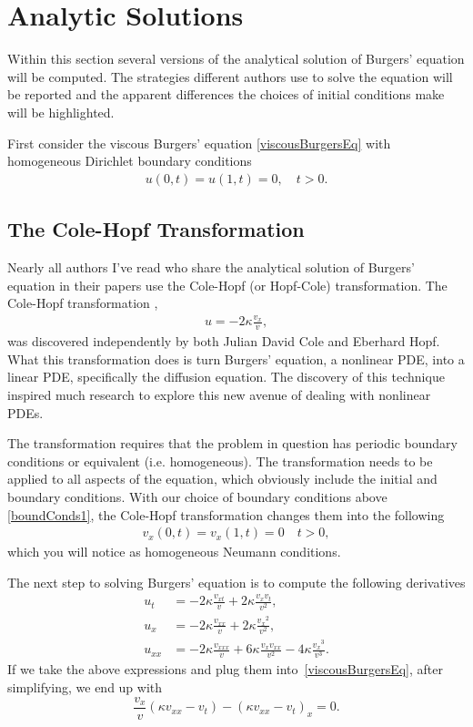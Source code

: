 \documentclass[undefended]{sfuthesis}
\begin{document}
\chapter{Analytic Solutions}
\label{sec:analyticalSolution}

Within this section several versions of the analytical solution of Burgers' equation will be computed. The strategies different authors use to solve the equation will be reported and the apparent differences the choices of initial conditions make will be highlighted. 

First consider the viscous Burgers' equation \eqref{viscousBurgersEq} with homogeneous Dirichlet boundary conditions
\begin{align}
u(0, t) = u(1, t) = 0, \quad t > 0. \label{boundConds1}
\end{align}

\section{The Cole-Hopf Transformation}
\label{sec:coleHopf}

Nearly all authors I've read who share the analytical solution of Burgers' equation in their papers use the Cole-Hopf (or Hopf-Cole) transformation. The Cole-Hopf transformation \cite{hopf, cole},
\begin{align}
u = -2 \kappa \frac{v_x}{v}, \label{coleHopf}
\end{align}
was discovered independently by both Julian David Cole and Eberhard Hopf. What this transformation does is turn Burgers' equation, a nonlinear PDE, into a linear PDE, specifically the diffusion equation. The discovery of this technique inspired much research to explore this new avenue of dealing with nonlinear PDEs. 

The transformation requires that the problem in question has periodic boundary conditions or equivalent (i.e. homogeneous). The transformation needs to be applied to all aspects of the equation, which obviously include the initial and boundary conditions. With our choice of boundary conditions above \eqref{boundConds1}, the Cole-Hopf transformation changes them into the following
\begin{align}
v_x(0, t) = v_x(1, t) = 0 \quad t > 0, \label{boundConds1ColeHopf}
\end{align}
which you will notice as homogeneous Neumann conditions. 

The next step to solving Burgers' equation is to compute the following derivatives
\begin{align*}
u_t    &= -2 \kappa \frac{v_{xt }}{v} + 2 \kappa \frac{v_x v_t}{v^2}, \\
u_x    &= -2 \kappa \frac{v_{xx }}{v} + 2 \kappa \frac{{v_x}^2}{v^2}, \\
u_{xx} &= -2 \kappa \frac{v_{xxx}}{v} + 6 \kappa \frac{v_x v_{xx}}{v^2} - 4 \kappa \frac{{v_x}^3}{v^3}.
\end{align*}
If we take the above expressions and plug them into~\eqref{viscousBurgersEq}, after simplifying, we end up with \[\frac{v_x}{v}(\kappa v_{xx} - v_t) - (\kappa v_{xx} - v_t)_x = 0. \] 
\end{document}
